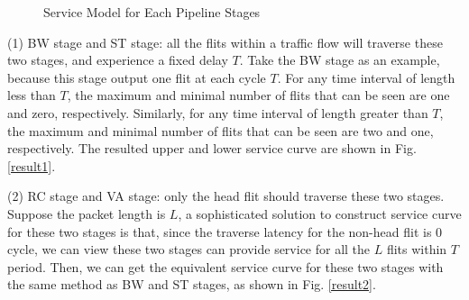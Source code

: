 \documentclass[10pt,journal]{IEEEtran}
\begin{document}
\begin{figure}
  \caption{Service Model for Each Pipeline Stages}
\end{figure}

(1) BW stage and ST stage: all the flits within a traffic flow will traverse these two stages, and experience a fixed delay $T$. Take the BW stage as an example, because this stage output one flit at each cycle $T$. For any time interval of length less than $T$, the maximum and minimal number of flits that can be seen are one and zero, respectively. Similarly, for any time interval of length greater than $T$, the maximum and minimal number of flits that can be seen are two and one, respectively. The resulted upper and lower service curve are shown in Fig. \ref{result1}.

(2) RC stage and VA stage: only the head flit should traverse these two stages. Suppose the packet length is $L$, a sophisticated solution to construct service curve for these two stages is that, since the traverse latency for the non-head flit is $0$ cycle, we can view these two stages can provide service for all the $L$ flits within $T$ period. Then, we can get the equivalent service curve for these two stages with the same method as BW and ST stages, as shown in Fig. \ref{result2}.
\end{document}
